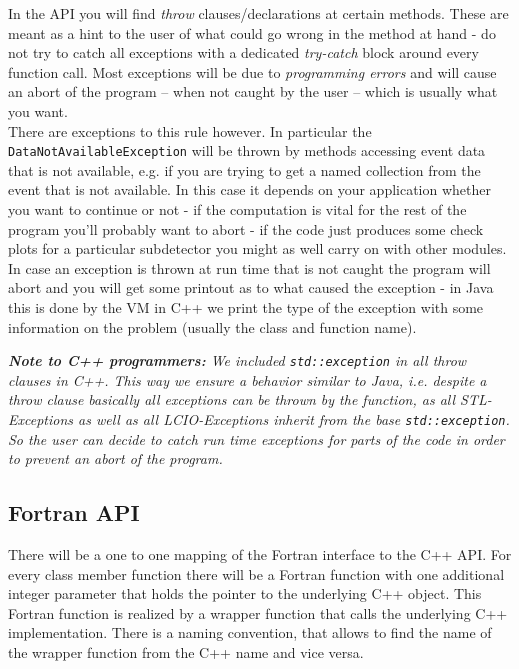 \documentclass[twoside]{article}
\begin{document}
In the API you will find {\em throw} clauses/declarations at certain methods. These are meant as a hint
to the user of what could go wrong in the method at hand - do not try to catch all exceptions with a 
dedicated {\em try-catch} block around every function call. Most exceptions will be due to 
{\em programming errors} and will cause an abort of the program -- when not caught by the user -- 
which is usually what you want.\\
There are exceptions to this rule however. In particular the \verb$DataNotAvailableException$ will be
thrown by methods accessing event data that is not available, e.g. if you are trying to get a named 
collection from the event that is not available. 
In this case it depends on your application whether you want to continue or not - if the 
computation is vital for the rest of the program you'll probably want to abort - if the code just
produces some check plots for a particular subdetector you might as well carry on with other 
modules.\\
In case an exception is thrown at run time that is not caught the program will abort and you will get 
some printout as to what caused the exception - 
in Java this is done by the VM in C++ we print the type of the exception with some information on the 
problem (usually the class and function name).

\vspace{\baselineskip}
{\it {\bf Note to C++ programmers:} We included \verb$std::exception$ in all {\em throw} clauses in 
C++. This way we ensure a behavior similar to Java, i.e. despite a {\em throw}
clause basically all exceptions can be thrown by the function, as all STL-Exceptions 
as well as all LCIO-Exceptions inherit from the base \verb$std::exception$. So the user can decide to
catch {\em run time} exceptions for parts of the code in order to prevent an abort of the program. 
}



\subsection{Fortran API}
There will be a one to one mapping of the Fortran interface to the C++ API. For every class member 
function there will be a Fortran function with one additional integer parameter that holds the 
pointer to the underlying C++ object. This Fortran function is realized by a wrapper function 
that calls the underlying C++ implementation.
There is a naming convention, that allows to find the name of 
the wrapper function from the C++ name and vice versa. 
\end{document}
